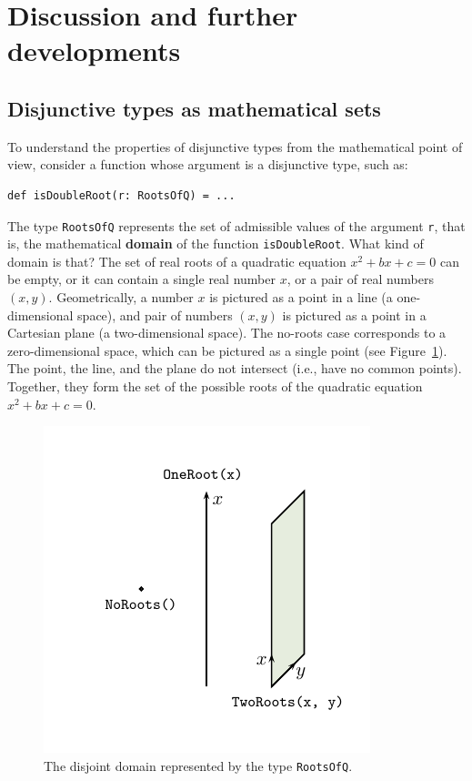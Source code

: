 \section{Discussion and further developments}

\subsection{Disjunctive types as mathematical sets}

To understand the properties of disjunctive types from the mathematical
point of view, consider a function whose argument is a disjunctive
type, such as:
\begin{lstlisting}
def isDoubleRoot(r: RootsOfQ) = ...
\end{lstlisting}
The type \lstinline!RootsOfQ! represents the set of admissible values
of the argument \lstinline!r!, that is, the mathematical \textbf{domain}
of the function \lstinline!isDoubleRoot!. What kind of domain is
that? The set of real roots of a quadratic equation $x^{2}+bx+c=0$
can be empty, or it can contain a single real number $x$, or a pair
of real numbers $\left(x,y\right)$. Geometrically, a number $x$
is pictured as a point in a line (a one-dimensional space), and pair
of numbers $\left(x,y\right)$ is pictured as a point in a Cartesian
plane (a two-dimensional space). The no-roots case corresponds to
a zero-dimensional space, which can be pictured as a single point
(see Figure~\ref{fig:RootsOfQ-disjoint-domain}). The point, the
line, and the plane do not intersect (i.e., have no common points).
Together, they form the set of the possible roots of the quadratic
equation $x^{2}+bx+c=0$.

\begin{figure}
\begin{centering}
\hspace{-1cm}\includegraphics[scale=1.2]{chapter3-picture}
\par\end{centering}
\vspace{-1.4\baselineskip}
\caption{The disjoint domain represented by the type \lstinline!RootsOfQ!.\label{fig:RootsOfQ-disjoint-domain}}
\end{figure}

